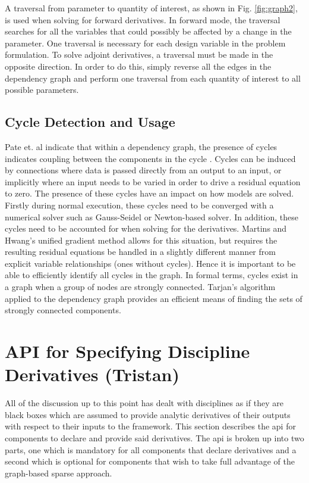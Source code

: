 \documentclass[]{aiaa-tc} %
\begin{document}
        A traversal from parameter to quantity of interest, as shown in Fig. \ref{fig:graph2}, is used when solving for 
        forward derivatives. In forward mode, the traversal searches for all the variables that could possibly 
        be affected by a change in the parameter. One traversal is necessary for each design variable in the 
        problem formulation. To solve adjoint derivatives, a traversal must be made in 
        the opposite direction. In order to do this, simply reverse all the edges in the dependency graph and 
        perform one traversal from each quantity of interest to all possible parameters. 
        


    \subsection{Cycle Detection and Usage}
        Pate et. al indicate that within a dependency graph, the presence of cycles indicates coupling between
        the components in the cycle \cite{graph_problem2013}. Cycles can be induced by connections
        where data is passed directly from an output to an input, or implicitly where an input needs to
        be varied in order to drive a residual equation to zero. The presence of these cycles have 
        an impact on how models are solved. Firstly during normal execution, these cycles 
        need to be converged with a numerical solver such as Gauss-Seidel or Newton-based solver.
        In addition, these cycles need to be accounted for when solving for the derivatives. Martins and Hwang's 
        unified gradient method allows for this situation, but requires the resulting residual equations be
        handled in a slightly different manner from explicit variable relationships (ones without cycles). Hence 
        it is important to be able to efficiently identify all cycles in the graph. In formal terms, 
        cycles exist in a graph when a group of nodes are strongly connected. Tarjan's algorithm 
        applied to the dependency graph provides an efficient means of finding the sets of strongly 
        connected components\cite{tarjan1972depth,nuutila1994finding}. 


    \section{API for Specifying Discipline Derivatives (Tristan)}

        All of the discussion up to this point has dealt with disciplines as if they are black boxes
        which are assumed to provide analytic derivatives of their outputs with respect to their inputs
        to the framework. This section describes the api for components to declare and provide
        said derivatives. The api is broken up into two parts, one which is mandatory for all components
        that declare derivatives and a second which is optional for components that wish to take full
        advantage of the graph-based sparse approach.
\end{document}
